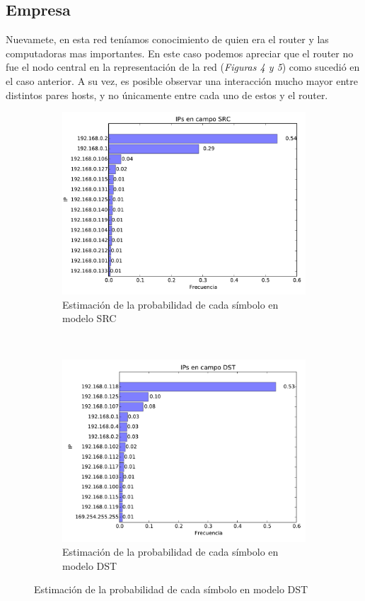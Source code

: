 \subsection{Empresa}

Nuevamete, en esta red teníamos conocimiento de quien era el router y las 
computadoras mas importantes. 
En este caso podemos apreciar que el router no fue el nodo central en la 
representaci\'on de la red (\emph{Figuras 4 y 5}) como sucedi\'o en el caso
anterior. A su vez, es posible observar una interacción mucho mayor 
entre distintos pares hosts, y no únicamente entre cada uno de estos y el
router.

\begin{figure}[H]
	\center
	\begin{subfigure}{0.4\textwidth}
		\includegraphics[width=1.0\textwidth]{resultados/empresa/ipsSrc_2_05542931604.pdf}
		\caption{Estimaci\'on de la probabilidad de cada s\'imbolo en modelo SRC}
	\end{subfigure}
	~
	\begin{subfigure}{0.4\textwidth}
		\includegraphics[width=1.0\textwidth]{resultados/empresa/ipsDst_2_99926622579.pdf}
		\caption{Estimaci\'on de la probabilidad de cada s\'imbolo en modelo DST}
	\end{subfigure}
\end{figure}

